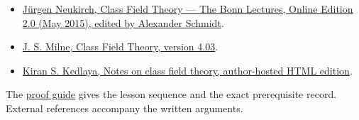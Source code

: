 \documentclass[11pt,a4paper]{article}
\newcommand{\tightlist}{\setlength{\itemsep}{0pt}\setlength{\parskip}{0pt}}
\begin{document}
\begin{itemize}
\tightlist
\item
  \href{https://www.mathi.uni-heidelberg.de/~schmidt/Neukirch-en/Neukirch_cft_02_may15.pdf}{Jürgen
  Neukirch, Class Field Theory --- The Bonn Lectures, Online Edition 2.0
  (May 2015), edited by Alexander Schmidt}.
\item
  \href{https://www.jmilne.org/math/CourseNotes/CFT.pdf}{J. S. Milne,
  Class Field Theory, version 4.03}.
\item
  \href{https://kskedlaya.org/cft/sec_abstractcft1.html}{Kiran S.
  Kedlaya, Notes on class field theory, author-hosted HTML edition}.
\end{itemize}

The \href{../free-proofs.html}{proof guide} gives the lesson sequence
and the exact prerequisite record. External references accompany the
written arguments.
\end{document}
